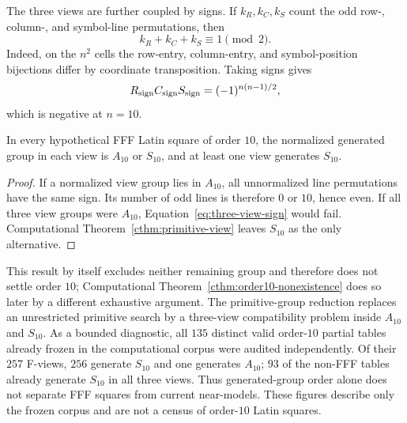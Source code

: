 The three views are further coupled by signs.  If $k_R,k_C,k_S$ count the odd
row-, column-, and symbol-line permutations, then
\begin{equation}
  k_R+k_C+k_S\equiv 1\pmod 2.
  \label{eq:three-view-sign}
\end{equation}
Indeed, on the $n^2$ cells the row-entry, column-entry, and symbol-position
bijections differ by coordinate transposition.  Taking signs gives
\[
  R_{\rm sign}C_{\rm sign}S_{\rm sign}
  =(-1)^{n(n-1)/2},
\]
which is negative at $n=10$.

\begin{corollary}\label{cor:at-least-one-s10}
In every hypothetical FFF Latin square of order $10$, the normalized
generated group in each view is $A_{10}$ or $S_{10}$, and at least one view
generates $S_{10}$.
\end{corollary}

\begin{proof}
If a normalized view group lies in $A_{10}$, all unnormalized line
permutations have the same sign.  Its number of odd lines is therefore $0$ or
$10$, hence even.  If all three view groups were $A_{10}$,
Equation~\eqref{eq:three-view-sign} would fail.  Computational
Theorem~\ref{cthm:primitive-view} leaves $S_{10}$ as the only alternative.
\end{proof}

This result by itself excludes neither remaining group and therefore does not
settle order $10$; Computational
Theorem~\ref{cthm:order10-nonexistence} does so later by a different exhaustive
argument.  The primitive-group reduction replaces an unrestricted primitive
search by a three-view compatibility problem inside $A_{10}$ and $S_{10}$.
As a bounded diagnostic, all $135$ distinct valid order-$10$ partial tables
already frozen in the computational corpus were audited independently.  Of
their $257$ F-views, $256$ generate $S_{10}$ and one generates $A_{10}$;
$93$ of the non-FFF tables already generate $S_{10}$ in all three views.
Thus generated-group order alone does not separate FFF squares from current
near-models.  These figures describe only the frozen corpus and are not a
census of order-$10$ Latin squares.
